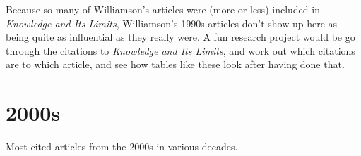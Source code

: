 \documentclass[
  10pt,
  letterpaper,
  DIV=11,
  numbers=noendperiod,
  twoside]{scrartcl}
\begin{document}
Because so many of Williamson's articles were (more-or-less) included in
\emph{Knowledge and Its Limits}, Williamson's 1990s articles don't show
up here as being quite as influential as they really were. A fun
research project would be go through the citations to \emph{Knowledge
and Its Limits}, and work out which citations are to which article, and
see how tables like these look after having done that.

\section{2000s}\label{s-3}

\begin{table}

\caption{\label{tbl-articles-2000s}Most cited articles from the 2000s in
various decades.}

\begin{minipage}{0.33\linewidth}


\centering{

}
\end{minipage}
\end{table}
\end{document}
